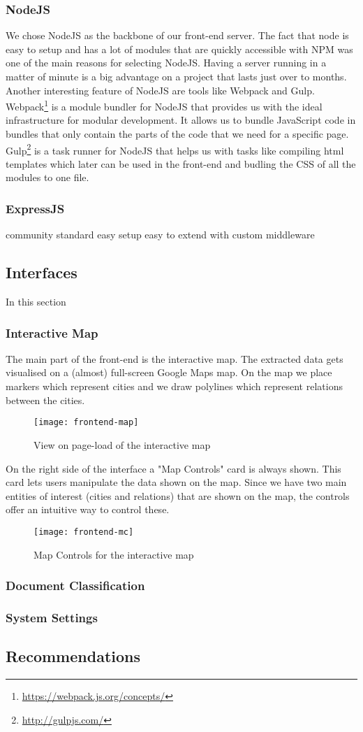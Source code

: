 \subsubsection{NodeJS}
We chose NodeJS as the backbone of our front-end server. The fact that node is easy to setup and has a lot of modules that are quickly accessible with NPM was one of the main reasons for selecting NodeJS. Having a server running in a matter of minute is a big advantage on a project that lasts just over to months.\\
Another interesting feature of NodeJS are tools like Webpack and Gulp. Webpack\footnote{\url{https://webpack.js.org/concepts/}} is a module bundler for NodeJS that provides us with the ideal infrastructure for modular development. It allows us to bundle JavaScript code in bundles that only contain the parts of the code that we need for a specific page. Gulp\footnote{\url{http://gulpjs.com/}} is a task runner for NodeJS that helps us with tasks like compiling html templates which later can be used in the front-end and budling the CSS of all the modules to one file.
\subsubsection{ExpressJS}

community standard
easy setup
easy to extend with custom middleware

\subsection{Interfaces}
In this section 
\subsubsection{Interactive Map}
The main part of the front-end is the interactive map. The extracted data gets visualised on a (almost) full-screen Google Maps map. On the map we place markers which represent cities and we draw polylines which represent relations between the cities.

\begin{figure}[h]
\centering
\texttt{[image: frontend-map]}
\caption{View on page-load of the interactive map}
\label{fig:frontend-map}
\end{figure}

On the right side of the interface a "Map Controls" card is always shown. This card lets users manipulate the data shown on the map. Since we have two main entities of interest (cities and relations) that are shown on the map, the controls offer an intuitive way to control these.\\


\begin{figure}[h]
\centering
\texttt{[image: frontend-mc]}
\caption{Map Controls for the interactive map}
\label{fig:frontend-mc}
\end{figure}

\subsubsection{Document Classification}
\subsubsection{System Settings}

\subsection{Recommendations}